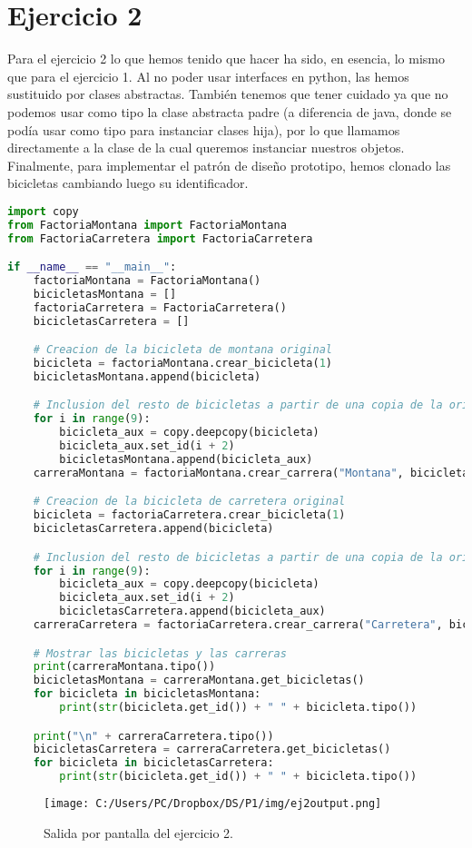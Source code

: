 \documentclass{article}
\begin{document}
\section{Ejercicio 2}
Para el ejercicio 2 lo que hemos tenido que hacer ha sido, en esencia, lo mismo que para el ejercicio 1. Al no poder usar interfaces en python, las hemos sustituido por clases abstractas. También tenemos que tener cuidado ya que no podemos usar como tipo la clase abstracta padre (a diferencia de java, donde se podía usar como tipo para instanciar clases hija), por lo que llamamos directamente a la clase de la cual queremos instanciar nuestros objetos. Finalmente, para implementar el patrón de diseño prototipo, hemos clonado las bicicletas cambiando luego su identificador. 
\begin{lstlisting}[language=Python, caption={main.py}]
import copy
from FactoriaMontana import FactoriaMontana
from FactoriaCarretera import FactoriaCarretera

if __name__ == "__main__":
    factoriaMontana = FactoriaMontana()
    bicicletasMontana = []
    factoriaCarretera = FactoriaCarretera()
    bicicletasCarretera = []

    # Creacion de la bicicleta de montana original
    bicicleta = factoriaMontana.crear_bicicleta(1)
    bicicletasMontana.append(bicicleta)

    # Inclusion del resto de bicicletas a partir de una copia de la original
    for i in range(9):
        bicicleta_aux = copy.deepcopy(bicicleta)
        bicicleta_aux.set_id(i + 2)
        bicicletasMontana.append(bicicleta_aux)
    carreraMontana = factoriaMontana.crear_carrera("Montana", bicicletasMontana)

    # Creacion de la bicicleta de carretera original
    bicicleta = factoriaCarretera.crear_bicicleta(1)
    bicicletasCarretera.append(bicicleta)

    # Inclusion del resto de bicicletas a partir de una copia de la original
    for i in range(9):
        bicicleta_aux = copy.deepcopy(bicicleta)
        bicicleta_aux.set_id(i + 2)
        bicicletasCarretera.append(bicicleta_aux)
    carreraCarretera = factoriaCarretera.crear_carrera("Carretera", bicicletasCarretera)

    # Mostrar las bicicletas y las carreras
    print(carreraMontana.tipo())
    bicicletasMontana = carreraMontana.get_bicicletas()
    for bicicleta in bicicletasMontana:
        print(str(bicicleta.get_id()) + " " + bicicleta.tipo())

    print("\n" + carreraCarretera.tipo())
    bicicletasCarretera = carreraCarretera.get_bicicletas()
    for bicicleta in bicicletasCarretera:
        print(str(bicicleta.get_id()) + " " + bicicleta.tipo())   
\end{lstlisting}
\begin{figure}[H]
\centering
\texttt{[image: C:/Users/PC/Dropbox/DS/P1/img/ej2output.png]}
\caption{Salida por pantalla del ejercicio 2.}
\end{figure}
\end{document}

